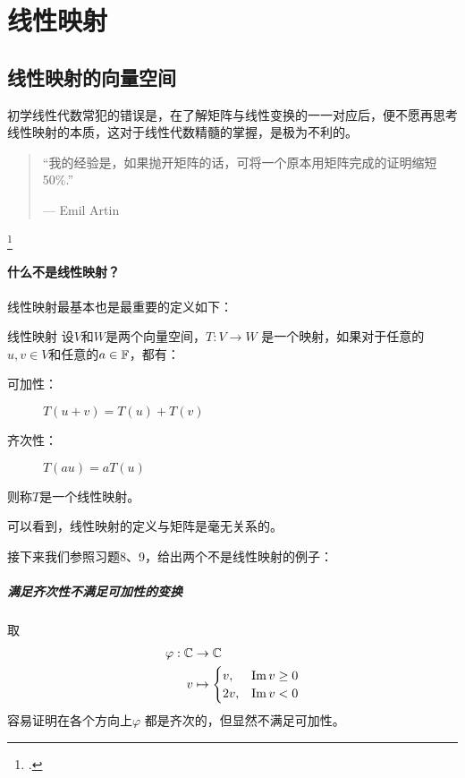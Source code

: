 \chapter{线性映射}
\section{线性映射的向量空间}
初学线性代数常犯的错误是，在了解矩阵与线性变换的一一对应后，便不愿再思考线性映射的本质，这对于线性代数精髓的掌握，是极为不利的。
\begin{quote}
    ``我的经验是，如果抛开矩阵的话，可将一个原本用矩阵完成的证明缩短 50\%.''

\hfill --- Emil Artin
\end{quote}\footcite[p.~67]{LADR}
\subsubsection{什么不是线性映射？}
线性映射最基本也是最重要的定义如下：
\begin{definition}{线性映射}
    设\(V\)和\(W\)是两个向量空间，\(T: V \to W\) 是一个映射，如果对于任意的\(u,
    v \in V\)和任意的\(a \in \mathbb{F}\)，都有：
    \begin{description}
        \item[可加性：] \(T(u+v)=T(u)+T(v)\)
        \item[齐次性：] \(T(a u) = a T(u)\)
    \end{description}
    则称\(T\)是一个线性映射。
\end{definition}
可以看到，线性映射的定义与矩阵是毫无关系的。

接下来我们参照习题8、9，给出两个不是线性映射的例子：

\paragraph{满足齐次性不满足可加性的变换}
取
\begin{align*}
    \varphi: \mathbb{C} &\to \mathbb{C} \\
    v &\mapsto
    \begin{cases}
        v, &\operatorname{Im} v \geq 0 \\
        2v, &\operatorname{Im} v < 0
    \end{cases}
\end{align*}
容易证明在各个方向上\(\varphi\) 都是齐次的，但显然不满足可加性。

